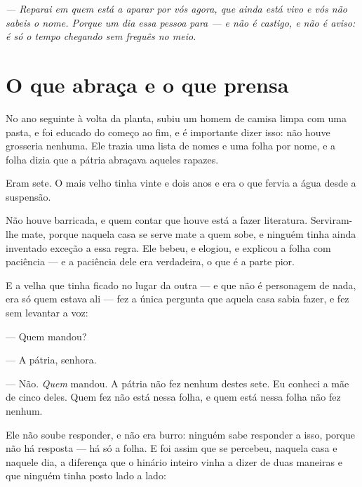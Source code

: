 \documentclass[livro.tex]{subfiles}
\begin{document}
\medskip

\begin{center}
\emph{--- Reparai em quem está a aparar por vós agora, que ainda está vivo e vós não sabeis o
nome. Porque um dia essa pessoa para --- e não é castigo, e não é aviso: é só o tempo chegando
sem freguês no meio.}
\end{center}



\chapter{O que abraça e o que prensa}

No ano seguinte à volta da planta, subiu um homem de camisa limpa com uma pasta, e foi educado do
começo ao fim, e é importante dizer isso: não houve grosseria nenhuma. Ele trazia uma lista de
nomes e uma folha por nome, e a folha dizia que a pátria abraçava aqueles rapazes.

Eram sete. O mais velho tinha vinte e dois anos e era o que fervia a água desde a suspensão.

\medskip

Não houve barricada, e quem contar que houve está a fazer literatura. Serviram-lhe mate, porque
naquela casa se serve mate a quem sobe, e ninguém tinha ainda inventado exceção a essa regra. Ele
bebeu, e elogiou, e explicou a folha com paciência --- e a paciência dele era verdadeira, o que é a
parte pior.

E a velha que tinha ficado no lugar da outra --- e que não é personagem de nada, era só quem
estava ali --- fez a única pergunta que aquela casa sabia fazer, e fez sem levantar a voz:

--- Quem mandou?

--- A pátria, senhora.

--- Não. \emph{Quem} mandou. A pátria não fez nenhum destes sete. Eu conheci a mãe de cinco deles.
Quem fez não está nessa folha, e quem está nessa folha não fez nenhum.

\medskip

Ele não soube responder, e não era burro: ninguém sabe responder a isso, porque não há resposta ---
há só a folha. E foi assim que se percebeu, naquela casa e naquele dia, a diferença que o hinário
inteiro vinha a dizer de duas maneiras e que ninguém tinha posto lado a lado:
\end{document}

